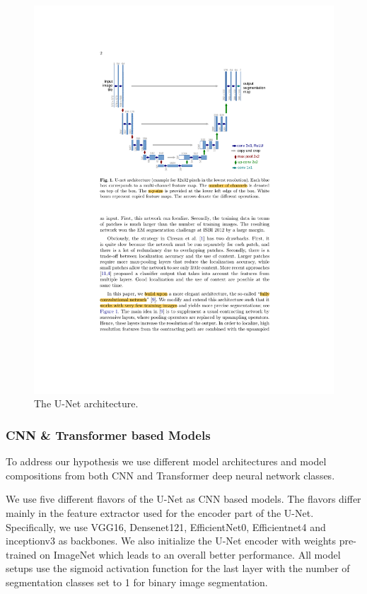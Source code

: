 \begin{figure}[ht]
\centering
\includegraphics[width=\columnwidth]{assets/u_net.pdf}
\caption[Lesion Images]
{The U-Net architecture.}
\label{u_net}
\end{figure}



\subsubsection{CNN \& Transformer based Models}

To address our hypothesis we use different model architectures and model compositions from both CNN and Transformer deep neural network classes.

\par
We use five different flavors of the U-Net as CNN based models. The flavors differ mainly in the feature extractor used for the encoder part of the U-Net. Specifically, we use VGG16, Densenet121, EfficientNet0, Efficientnet4 and inceptionv3 as backbones. We also initialize the U-Net encoder with weights pre-trained on ImageNet which leads to an overall better performance. All model setups use the sigmoid activation function for the last layer with the number of segmentation classes set to 1  for binary image segmentation.

